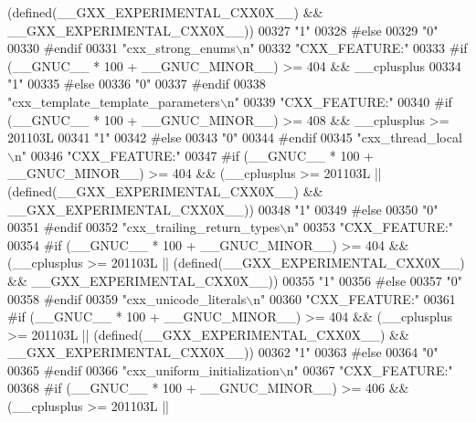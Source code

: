 \begin{DoxyCode}
{       (defined(\_\_GXX\_EXPERIMENTAL\_CXX0X\_\_) && \_\_GXX\_EXPERIMENTAL\_CXX0X\_\_))}
00327 \textcolor{stringliteral}{"1"}
00328 \textcolor{preprocessor}{#else}
00329 \textcolor{stringliteral}{"0"}
00330 \textcolor{preprocessor}{#endif}
00331 \textcolor{stringliteral}{"cxx\_strong\_enums\(\backslash\)n"}
00332 \textcolor{stringliteral}{"CXX\_FEATURE:"}
00333 \textcolor{preprocessor}{#if (\_\_GNUC\_\_ * 100 + \_\_GNUC\_MINOR\_\_) >= 404 && \_\_cplusplus}
00334 \textcolor{stringliteral}{"1"}
00335 \textcolor{preprocessor}{#else}
00336 \textcolor{stringliteral}{"0"}
00337 \textcolor{preprocessor}{#endif}
00338 \textcolor{stringliteral}{"cxx\_template\_template\_parameters\(\backslash\)n"}
00339 \textcolor{stringliteral}{"CXX\_FEATURE:"}
00340 \textcolor{preprocessor}{#if (\_\_GNUC\_\_ * 100 + \_\_GNUC\_MINOR\_\_) >= 408 && \_\_cplusplus >= 201103L}
00341 \textcolor{stringliteral}{"1"}
00342 \textcolor{preprocessor}{#else}
00343 \textcolor{stringliteral}{"0"}
00344 \textcolor{preprocessor}{#endif}
00345 \textcolor{stringliteral}{"cxx\_thread\_local\(\backslash\)n"}
00346 \textcolor{stringliteral}{"CXX\_FEATURE:"}
00347 \textcolor{preprocessor}{#if (\_\_GNUC\_\_ * 100 + \_\_GNUC\_MINOR\_\_) >= 404 && (\_\_cplusplus >= 201103L ||
       (defined(\_\_GXX\_EXPERIMENTAL\_CXX0X\_\_) && \_\_GXX\_EXPERIMENTAL\_CXX0X\_\_))}
00348 \textcolor{stringliteral}{"1"}
00349 \textcolor{preprocessor}{#else}
00350 \textcolor{stringliteral}{"0"}
00351 \textcolor{preprocessor}{#endif}
00352 \textcolor{stringliteral}{"cxx\_trailing\_return\_types\(\backslash\)n"}
00353 \textcolor{stringliteral}{"CXX\_FEATURE:"}
00354 \textcolor{preprocessor}{#if (\_\_GNUC\_\_ * 100 + \_\_GNUC\_MINOR\_\_) >= 404 && (\_\_cplusplus >= 201103L ||
       (defined(\_\_GXX\_EXPERIMENTAL\_CXX0X\_\_) && \_\_GXX\_EXPERIMENTAL\_CXX0X\_\_))}
00355 \textcolor{stringliteral}{"1"}
00356 \textcolor{preprocessor}{#else}
00357 \textcolor{stringliteral}{"0"}
00358 \textcolor{preprocessor}{#endif}
00359 \textcolor{stringliteral}{"cxx\_unicode\_literals\(\backslash\)n"}
00360 \textcolor{stringliteral}{"CXX\_FEATURE:"}
00361 \textcolor{preprocessor}{#if (\_\_GNUC\_\_ * 100 + \_\_GNUC\_MINOR\_\_) >= 404 && (\_\_cplusplus >= 201103L ||
       (defined(\_\_GXX\_EXPERIMENTAL\_CXX0X\_\_) && \_\_GXX\_EXPERIMENTAL\_CXX0X\_\_))}
00362 \textcolor{stringliteral}{"1"}
00363 \textcolor{preprocessor}{#else}
00364 \textcolor{stringliteral}{"0"}
00365 \textcolor{preprocessor}{#endif}
00366 \textcolor{stringliteral}{"cxx\_uniform\_initialization\(\backslash\)n"}
00367 \textcolor{stringliteral}{"CXX\_FEATURE:"}
00368 \textcolor{preprocessor}{#if (\_\_GNUC\_\_ * 100 + \_\_GNUC\_MINOR\_\_) >= 406 && (\_\_cplusplus >= 201103L ||
}
\end{DoxyCode}
